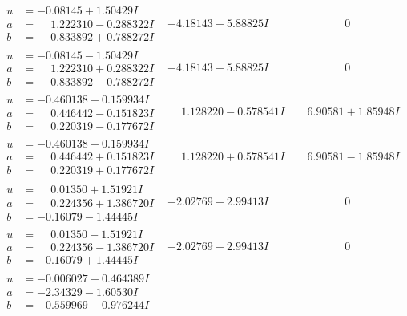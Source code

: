 \documentclass[1p]{elsarticle_modified}
\theoremstyle{definition}
\begin{document}
$$\begin{array}{c|c|c}
\begin{aligned}
u &= -0.08145 + 1.50429 I \\
a &= \phantom{-}1.222310 - 0.288322 I \\
b &= \phantom{-}0.833892 + 0.788272 I\end{aligned}
 & -4.18143 - 5.88825 I & \phantom{-0.000000 } 0 \\ \hline\begin{aligned}
u &= -0.08145 - 1.50429 I \\
a &= \phantom{-}1.222310 + 0.288322 I \\
b &= \phantom{-}0.833892 - 0.788272 I\end{aligned}
 & -4.18143 + 5.88825 I & \phantom{-0.000000 } 0 \\ \hline\begin{aligned}
u &= -0.460138 + 0.159934 I \\
a &= \phantom{-}0.446442 - 0.151823 I \\
b &= \phantom{-}0.220319 - 0.177672 I\end{aligned}
 & \phantom{-}1.128220 - 0.578541 I & \phantom{-}6.90581 + 1.85948 I \\ \hline\begin{aligned}
u &= -0.460138 - 0.159934 I \\
a &= \phantom{-}0.446442 + 0.151823 I \\
b &= \phantom{-}0.220319 + 0.177672 I\end{aligned}
 & \phantom{-}1.128220 + 0.578541 I & \phantom{-}6.90581 - 1.85948 I \\ \hline\begin{aligned}
u &= \phantom{-}0.01350 + 1.51921 I \\
a &= \phantom{-}0.224356 + 1.386720 I \\
b &= -0.16079 - 1.44445 I\end{aligned}
 & -2.02769 - 2.99413 I & \phantom{-0.000000 } 0 \\ \hline\begin{aligned}
u &= \phantom{-}0.01350 - 1.51921 I \\
a &= \phantom{-}0.224356 - 1.386720 I \\
b &= -0.16079 + 1.44445 I\end{aligned}
 & -2.02769 + 2.99413 I & \phantom{-0.000000 } 0 \\ \hline\begin{aligned}
u &= -0.006027 + 0.464389 I \\
a &= -2.34329 - 1.60530 I \\
b &= -0.559969 + 0.976244 I\end{aligned}

\end{array}$$
\end{document}
